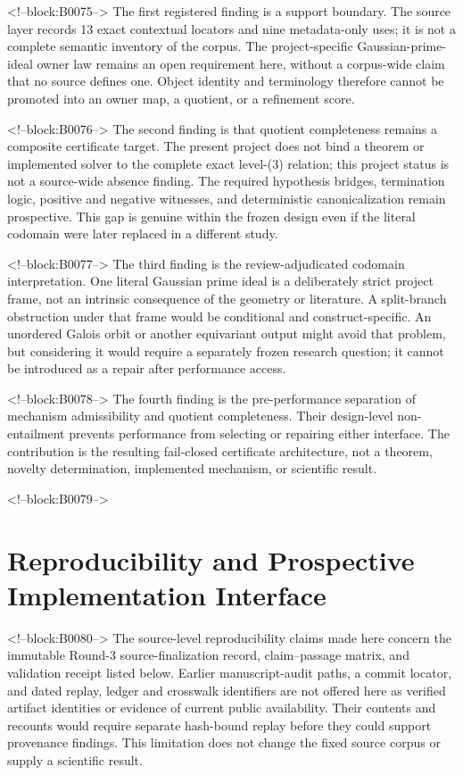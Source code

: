 \documentclass[11pt,a4paper]{article}
\begin{document}
<!--block:B0075-->
The first registered finding is a support boundary. The source layer records 13 exact contextual locators and nine metadata-only uses; it is not a complete semantic inventory of the corpus. The project-specific Gaussian-prime-ideal owner law remains an open requirement here, without a corpus-wide claim that no source defines one. Object identity and terminology therefore cannot be promoted into an owner map, a quotient, or a refinement score.

<!--block:B0076-->
The second finding is that quotient completeness remains a composite certificate target. The present project does not bind a theorem or implemented solver to the complete exact level-(3) relation; this project status is not a source-wide absence finding. The required hypothesis bridges, termination logic, positive and negative witnesses, and deterministic canonicalization remain prospective. This gap is genuine within the frozen design even if the literal codomain were later replaced in a different study.

<!--block:B0077-->
The third finding is the review-adjudicated codomain interpretation. One literal Gaussian prime ideal is a deliberately strict project frame, not an intrinsic consequence of the geometry or literature. A split-branch obstruction under that frame would be conditional and construct-specific. An unordered Galois orbit or another equivariant output might avoid that problem, but considering it would require a separately frozen research question; it cannot be introduced as a repair after performance access.

<!--block:B0078-->
The fourth finding is the pre-performance separation of mechanism admissibility and quotient completeness. Their design-level non-entailment prevents performance from selecting or repairing either interface. The contribution is the resulting fail-closed certificate architecture, not a theorem, novelty determination, implemented mechanism, or scientific result.

<!--block:B0079-->
\section{Reproducibility and Prospective Implementation Interface}

<!--block:B0080-->
\begingroup\sloppy
The source-level reproducibility claims made here concern the immutable Round-3 source-finalization record, claim--passage matrix, and validation receipt listed below. Earlier manuscript-audit paths, a commit locator, and dated replay, ledger and crosswalk identifiers are not offered here as verified artifact identities or evidence of current public availability. Their contents and recounts would require separate hash-bound replay before they could support provenance findings. This limitation does not change the fixed source corpus or supply a scientific result.
\end{document}
